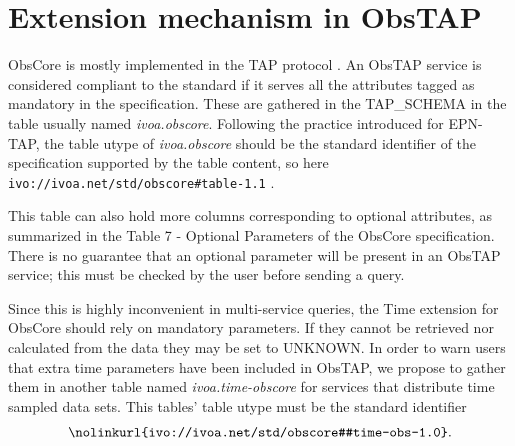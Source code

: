 \documentclass[11pt,a4paper]{ivoa}
\begin{document}
 \section{Extension mechanism in ObsTAP }
 \label{sec:comext}
 ObsCore is mostly implemented in the TAP protocol \citep{2019ivoa.spec.0927D}.
 An ObsTAP service is considered compliant to the standard if it serves all the attributes tagged as mandatory in the specification.
 These are gathered in the TAP\_SCHEMA in the table usually named \emph{ivoa.obscore}.
 Following the practice introduced  for EPN-TAP,  the table utype of \emph{ivoa.obscore} should be the standard identifier of the specification supported by the table content, so here \\ \texttt{ivo://ivoa.net/std/obscore\#table-1.1} .

 This table can also hold more columns corresponding to  optional attributes, as summarized in the Table 7 - Optional Parameters  of the ObsCore specification.
 There is no guarantee that an optional parameter will be present in an ObsTAP service; this must be checked by the user before sending a query.

Since this is highly inconvenient in multi-service queries, the Time extension for ObsCore should rely on mandatory parameters.
 If they cannot be retrieved nor calculated from the data they may be set to UNKNOWN.
 In order to warn users that extra time parameters have been included in ObsTAP, we propose to gather them  in another table named \emph{ivoa.time-obscore}
 for services that distribute time sampled data sets.
 This tables' table utype must be the standard identifier
$$\centerline{\nolinkurl{ivo://ivoa.net/std/obscore#time-obs-1.0}.}$$
\end{document}
